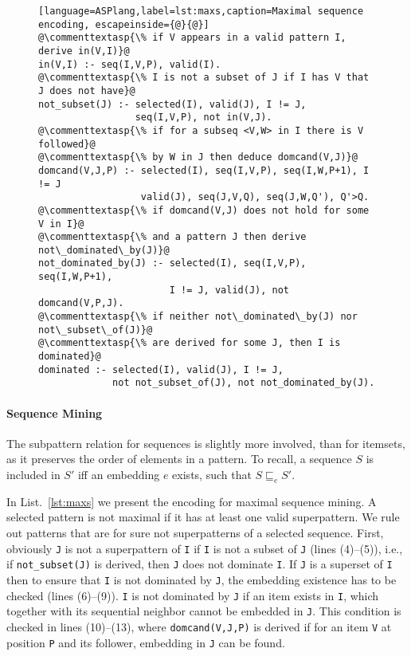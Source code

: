 \begin{figure}[t]
\small{ \begin{lstlisting}[language=ASPlang,label=lst:maxs,caption=Maximal sequence encoding, escapeinside={@}{@}]
@\commenttextasp{\% if V appears in a valid pattern I, derive in(V,I)}@
in(V,I) :- seq(I,V,P), valid(I).
@\commenttextasp{\% I is not a subset of J if I has V that J does not have}@
not_subset(J) :- selected(I), valid(J), I != J, 
                 seq(I,V,P), not in(V,J).
@\commenttextasp{\% if for a subseq <V,W> in I there is V followed}@
@\commenttextasp{\% by W in J then deduce domcand(V,J)}@
domcand(V,J,P) :- selected(I), seq(I,V,P), seq(I,W,P+1), I != J
                  valid(J), seq(J,V,Q), seq(J,W,Q'), Q'>Q.
@\commenttextasp{\% if domcand(V,J) does not hold for some V in I}@ 
@\commenttextasp{\% and a pattern J then derive not\_dominated\_by(J)}@
not_dominated_by(J) :- selected(I), seq(I,V,P), seq(I,W,P+1), 
                       I != J, valid(J), not domcand(V,P,J).
@\commenttextasp{\% if neither not\_dominated\_by(J) nor not\_subset\_of(J)}@
@\commenttextasp{\% are derived for some J, then I is dominated}@
dominated :- selected(I), valid(J), I != J, 
             not not_subset_of(J), not not_dominated_by(J). \end{lstlisting}}
 \end{figure}


\normalsize{\paragraph{Sequence Mining} 
The subpattern relation for sequences is slightly more involved, than for itemsets, as it preserves the order of elements in a pattern. To recall, a sequence $S$ is included in $S'$ iff an embedding $e$ exists, such that $S \sqsubseteq_e S'$.}

In List.~\ref{lst:maxs} we present the encoding for maximal sequence mining. A selected pattern is not maximal if it has at least one valid superpattern. We rule out patterns that are for sure not superpatterns of a selected sequence. First, obviously \texttt{J} is not a superpattern of \texttt{I} if \texttt{I} is not a subset of \texttt{J} (lines (4)--(5)), i.e., if \texttt{not\_subset(J)} is derived, then \texttt{J} does not dominate \texttt{I}. If \texttt{J} is a superset of \texttt{I} then to ensure that \texttt{I} is not dominated by \texttt{J}, the embedding existence has to be checked (lines (6)--(9)). \texttt{I} is not dominated by \texttt{J} if an item exists in \texttt{I}, which together with its sequential neighbor cannot be embedded in \texttt{J}.  This condition is checked in lines (10)--(13), where \texttt{domcand(V,J,P)} is derived if for an item \texttt{V} at position \texttt{P} and its follower, embedding in \texttt{J} can be found. 

